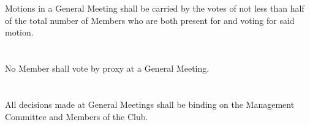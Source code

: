 \section{}
Motions in a General Meeting shall be carried by the votes of not less than half of the total number of Members who are both present for and voting for said motion.

\section{}
No Member shall vote by proxy at a General Meeting.

\section{}
All decisions made at General Meetings shall be binding on the Management Committee and Members of the Club.